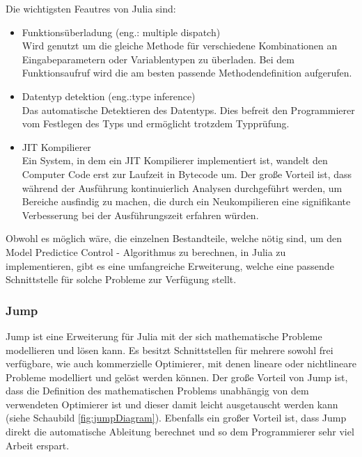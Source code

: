 \documentclass{like}
\begin{document}
Die wichtigsten Feautres von Julia sind:
\begin{itemize}
	
	\item Funktionsüberladung (eng.: multiple dispatch)\\Wird genutzt um die gleiche Methode für verschiedene Kombinationen an Eingabeparametern oder Variablentypen zu überladen. Bei dem Funktionsaufruf wird die am besten passende Methodendefinition aufgerufen. \\
	\item Datentyp detektion (eng.:type inference) \\Das automatische Detektieren des Datentyps. Dies befreit den Programmierer vom Festlegen des Typs und ermöglicht trotzdem Typprüfung. \\
	\item \ac{JIT} Kompilierer\\ Ein System, in dem ein \ac{JIT} Kompilierer implementiert ist, wandelt den Computer Code erst zur Laufzeit in Bytecode um. Der große Vorteil ist, dass während der Ausführung kontinuierlich Analysen durchgeführt werden, um Bereiche ausfindig zu machen, die durch ein Neukompilieren eine signifikante Verbesserung bei der Ausführungszeit erfahren würden. \\
\end{itemize}

Obwohl es möglich wäre, die einzelnen Bestandteile, welche nötig sind, um den Model Predictice Control - Algorithmus zu berechnen, in Julia zu implementieren, gibt es eine umfangreiche Erweiterung, welche eine passende Schnittstelle für solche Probleme zur Verfügung stellt.

\subsubsection*{Jump}
Jump ist eine Erweiterung für Julia mit der sich mathematische Probleme modellieren und lösen kann. Es besitzt Schnittstellen für mehrere sowohl frei verfügbare, wie auch kommerzielle Optimierer, mit denen lineare oder nichtlineare Probleme modelliert und gelöst werden können. Der große Vorteil von Jump ist, dass die Definition des mathematischen Problems unabhängig von dem verwendeten Optimierer ist und dieser damit leicht ausgetauscht werden kann (siehe Schaubild \ref{fig:jumpDiagram}). Ebenfalls ein großer Vorteil ist, dass Jump direkt  die automatische Ableitung berechnet und so dem Programmierer sehr viel Arbeit erspart. 
\end{document}
